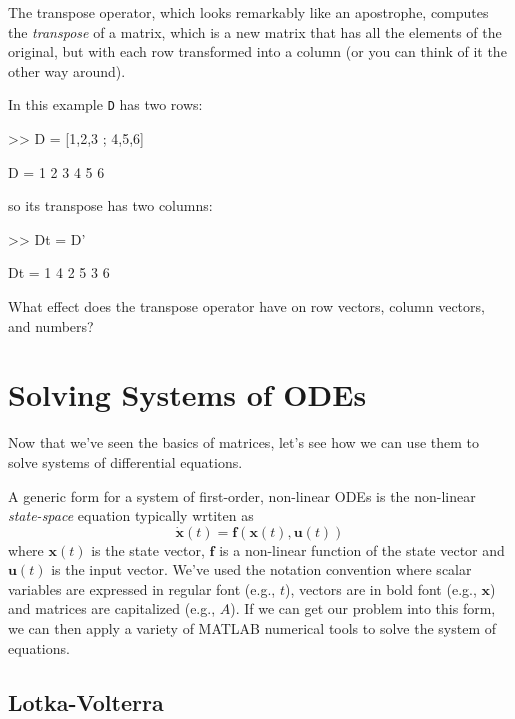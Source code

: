 \documentclass[../../book.tex]{subfiles}
\begin{document}
The transpose operator, which looks remarkably like an apostrophe,
computes the \emph{transpose} of a matrix, which is a new matrix
that has all the elements of the original, but with each row
transformed into a column (or you can think of it the other way around).


In this example \lstinline{D} has two rows:

\begin{code}
>> D = [1,2,3 ; 4,5,6]

D =  1     2     3
     4     5     6
\end{code}
so its transpose has two columns:

\begin{code}
>> Dt = D'

Dt = 1     4
     2     5
     3     6
\end{code}

\begin{ex}
What effect does the transpose operator
have on row vectors, column vectors, and numbers?
\end{ex}


\section{Solving Systems of ODEs}

Now that we've seen the basics of matrices, let's see how we can use them to solve systems of differential equations.

A generic form for a system of first-order, non-linear ODEs is the non-linear \emph{state-space} equation typically wrtiten as
\begin{equation} \label{e:nonlinearstatespace}
\dot{\mathbf{x}}(t) = \mathbf{f}(\mathbf{x}(t), \mathbf{u}(t))
\end{equation}
where \( \mathbf{x}(t) \) is the state vector, \( \mathbf{f} \) is a non-linear function of the state vector and \( \mathbf{u}(t) \) is the input vector.  We've used the notation convention where scalar variables are expressed in regular font (e.g., $t$), vectors are in bold font (e.g., $\mathbf{x}$) and matrices are capitalized (e.g., $A$).  If we can get our problem into this form, we can then apply a variety of MATLAB numerical tools to solve the system of equations.

\subsection{Lotka-Volterra}
\label{lotka}
\end{document}
